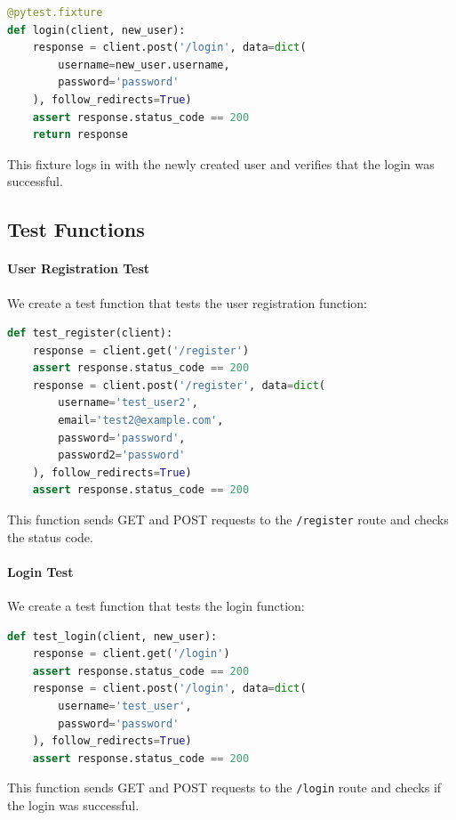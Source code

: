 \begin{lstlisting}[language=Python]
@pytest.fixture
def login(client, new_user):
    response = client.post('/login', data=dict(
        username=new_user.username,
        password='password'
    ), follow_redirects=True)
    assert response.status_code == 200
    return response
\end{lstlisting}

This fixture logs in with the newly created user and verifies that the login was successful.\newpage

\subsection{Test Functions}

\paragraph{User Registration Test}
We create a test function that tests the user registration function:

\begin{lstlisting}[language=Python]
def test_register(client):
    response = client.get('/register')
    assert response.status_code == 200
    response = client.post('/register', data=dict(
        username='test_user2',
        email='test2@example.com',
        password='password',
        password2='password'
    ), follow_redirects=True)
    assert response.status_code == 200
\end{lstlisting}

This function sends GET and POST requests to the \texttt{/register} route and checks the status code.

\paragraph{Login Test}
We create a test function that tests the login function:

\begin{lstlisting}[language=Python]
def test_login(client, new_user):
    response = client.get('/login')
    assert response.status_code == 200
    response = client.post('/login', data=dict(
        username='test_user',
        password='password'
    ), follow_redirects=True)
    assert response.status_code == 200
\end{lstlisting}

This function sends GET and POST requests to the \texttt{/login} route and checks if the login was successful.

